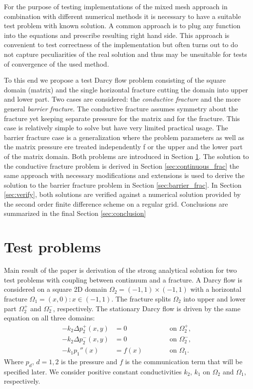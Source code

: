 \documentclass[a4paper,10pt]{article}
\def\Laplace{\Delta}
\begin{document}
For the purpose of testing implementations of the mixed mesh approach in combination with different numerical methods
it is necessary to have a suitable test problem with known solution. A common approach is to plug any function into the equations
and prescribe resulting right hand side. This approach is convenient to test correctness of the implementation but often turns out to
do not capture peculiarities of the real solution and thus may be unsuitable for tests of convergence of the used method. 

To this end we propose a test Darcy flow problem consisting of the square domain (matrix) and the single horizontal fracture 
cutting the domain into upper and lower part.  
Two cases are considered: the {\it conductive fracture} and the more general {\it barrier fracture}.
The conductive fracture assumes symmetry about the fracture yet keeping separate pressure for the matrix and for the fracture. 
This case is relatively simple to solve but have very limited practical usage.
The barrier fracture case is a generalization where the problem parameters as well as the matrix pressure ere treated independently f
or the upper and the lower part of the matrix domain. Both problems are introduced in Section \ref{sec:setting}.
The solution to the conductive fracture problem is derived in Section \ref{sec:continuous_frac} the same approach with necessary modifications and extensions
is used to derive the solution to the barrier fracture problem in Section \ref{sec:barrier_frac}. In Section \ref{sec:verify}, 
both solutions are verified against a numerical solution provided by the second order finite difference scheme on a regular grid. 
Conclusions are summarized in the final Section \ref{sec:conclusion} 




\section{Test problems}
\label{sec:setting}
Main result of the paper is derivation of the strong analytical solution for two test problems with coupling between continuum and a fracture.
A Darcy flow is considered  on a square 2D domain $\Omega_2 = (-1,1)\times(-1,1)$
with a horizontal fracture $\Omega_1 = { (x,0) : x\in (-1,1)}$. The fracture splits $\Omega_2$ into upper and 
lower part $\Omega_2^+$ and $\Omega_2^-$, respectively.
The stationary Darcy flow is driven by the same equation on all three domains:
\begin{align}
  \label{eq:Darcy_common}
  -k_2 \Laplace p^+_2(x,y) &= 0 \qquad &&\text{ on }\Omega_2^+,\\
  -k_2 \Laplace p^-_2(x,y) &= 0 \qquad &&\text{ on }\Omega_2^-,\\
  -k_1 p_1''(x) &= f(x) \qquad &&\text{ on }\Omega_1.
  \label{eq:Darcy_common_c}
\end{align}
Where $p_d$, $d=1,2$ is the pressure and $f$ is the communication term that will be specified later. 
We consider positive constant conductivities $k_2$, $k_1$ on $\Omega_2$ and $\Omega_1$, respectively.
\end{document}
